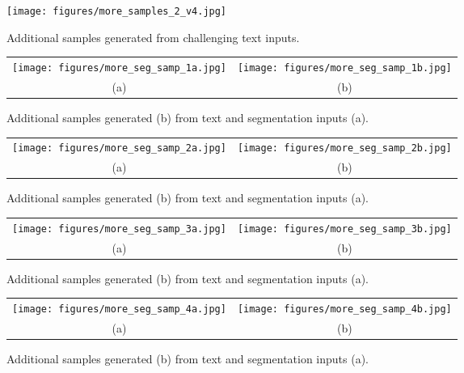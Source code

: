 \documentclass[final]{cvpr}
\begin{document}
\begin{figure*}[t]
    \centering
    \texttt{[image: figures/more\_samples\_2\_v4.jpg]}
    \caption{Additional samples generated from challenging text inputs.}
    \label{fig:more_samples_2}
\end{figure*}

\begin{figure*}[t]
    \centering
    \begin{tabular}{cc}
    \texttt{[image: figures/more\_seg\_samp\_1a.jpg]} & \texttt{[image: figures/more\_seg\_samp\_1b.jpg]} \\
        (a) & (b) 
    \end{tabular}
    \caption{Additional samples generated (b) from text and segmentation inputs (a).}
    \label{fig:more_seg_samples_1}
\end{figure*}

\begin{figure*}[t]
    \centering
    \begin{tabular}{cc}
    \texttt{[image: figures/more\_seg\_samp\_2a.jpg]} & \texttt{[image: figures/more\_seg\_samp\_2b.jpg]} \\
        (a) & (b) 
    \end{tabular}
    \caption{Additional samples generated (b) from text and segmentation inputs (a).}
    \label{fig:more_seg_samples_2}
\end{figure*}

\begin{figure*}[t]
    \centering
    \begin{tabular}{cc}
    \texttt{[image: figures/more\_seg\_samp\_3a.jpg]} & \texttt{[image: figures/more\_seg\_samp\_3b.jpg]} \\
        (a) & (b) 
    \end{tabular}
    \caption{Additional samples generated (b) from text and segmentation inputs (a).}
    \label{fig:more_seg_samples_3}
\end{figure*}

\begin{figure*}[t]
    \centering
    \begin{tabular}{cc}
    \texttt{[image: figures/more\_seg\_samp\_4a.jpg]} & \texttt{[image: figures/more\_seg\_samp\_4b.jpg]} \\
        (a) & (b) 
    \end{tabular}
    \caption{Additional samples generated (b) from text and segmentation inputs (a).}
    \label{fig:more_seg_samples_4}
\end{figure*}
\end{document}
